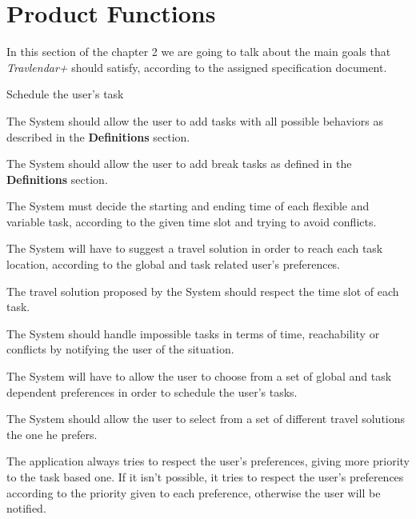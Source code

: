 \section{Product Functions}
In this section of the chapter 2 we are going to talk about the main goals that \emph{Travlendar+} should satisfy, according to the assigned specification document.

\begin{goalList}
\item \label{goal:task} Schedule the user's task

	\begin{enumerate}[label={[}G 1.\arabic*{]}]
    
    \item \label{goal:taskBehavior} The System should allow the user to add tasks with all possible behaviors as described in the \textbf{Definitions} section.
    
    
    \item \label{goal:breakTask}The System should allow the user to add break tasks as defined in the \textbf{Definitions} section.
    
    \item \label{goal:noTaskConflict} The System must decide the starting and ending time of each flexible and variable task, according to the given time slot and trying to avoid conflicts.
    \item \label{goal:reachability}The System will have to suggest a travel solution in order to reach each task location, according to the global and task related user's preferences.
    \item \label{goal:timeslot}The travel solution proposed by the System should respect the time slot of each task.
    \item
    \label{goal:impossibleTask}The System should handle impossible tasks in terms of time, reachability or conflicts by notifying the user of the situation. 
	\end{enumerate}
    
\item \label{goal:preferences}The System will have to allow the user to choose from a set of global and task dependent preferences in order to schedule the user's tasks. 

\item \label{goal:travel}The System should allow the user to select from a set of different travel solutions the one he prefers.

\item \label{goal:priority} The application always tries to respect the user's preferences, giving more priority to the task based one. If it isn't possible, it tries to respect the user's preferences according to the priority given to each preference, otherwise the user will be notified.


\end{goalList}
